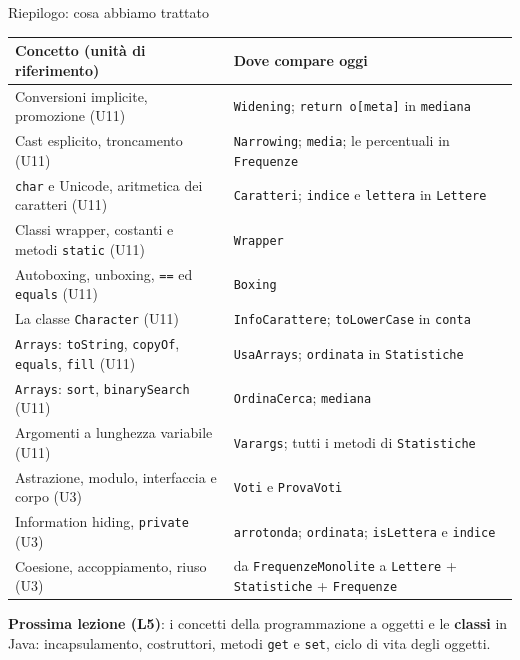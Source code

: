 \documentclass[10pt,aspectratio=169]{beamer}
\begin{document}
\begin{frame}{Riepilogo: cosa abbiamo trattato}
\footnotesize
\begin{center}
\renewcommand{\arraystretch}{1.25}
\begin{tabular}{|l|l|}
\hline
\textbf{Concetto (unità di riferimento)} & \textbf{Dove compare oggi} \\
\hline
Conversioni implicite, promozione (U11) & \texttt{Widening}; \texttt{return o[meta]} in \texttt{mediana} \\
\hline
Cast esplicito, troncamento (U11) & \texttt{Narrowing}; \texttt{media}; le percentuali in \texttt{Frequenze} \\
\hline
\texttt{char} e Unicode, aritmetica dei caratteri (U11) & \texttt{Caratteri}; \texttt{indice} e \texttt{lettera} in \texttt{Lettere} \\
\hline
Classi wrapper, costanti e metodi \texttt{static} (U11) & \texttt{Wrapper} \\
\hline
Autoboxing, unboxing, \texttt{==} ed \texttt{equals} (U11) & \texttt{Boxing} \\
\hline
La classe \texttt{Character} (U11) & \texttt{InfoCarattere}; \texttt{toLowerCase} in \texttt{conta} \\
\hline
\texttt{Arrays}: \texttt{toString}, \texttt{copyOf}, \texttt{equals}, \texttt{fill} (U11) & \texttt{UsaArrays}; \texttt{ordinata} in \texttt{Statistiche} \\
\hline
\texttt{Arrays}: \texttt{sort}, \texttt{binarySearch} (U11) & \texttt{OrdinaCerca}; \texttt{mediana} \\
\hline
Argomenti a lunghezza variabile (U11) & \texttt{Varargs}; tutti i metodi di \texttt{Statistiche} \\
\hline
Astrazione, modulo, interfaccia e corpo (U3) & \texttt{Voti} e \texttt{ProvaVoti} \\
\hline
Information hiding, \texttt{private} (U3) & \texttt{arrotonda}; \texttt{ordinata}; \texttt{isLettera} e \texttt{indice} \\
\hline
Coesione, accoppiamento, riuso (U3) & da \texttt{FrequenzeMonolite} a \texttt{Lettere} + \texttt{Statistiche} + \texttt{Frequenze} \\
\hline
\end{tabular}
\end{center}

\vspace{0.1cm}
\textbf{Prossima lezione (L5)}: i concetti della programmazione a oggetti e le \textbf{classi} in Java: incapsulamento, costruttori, metodi \texttt{get} e \texttt{set}, ciclo di vita degli oggetti.
\end{frame}
\end{document}
